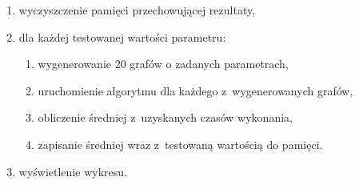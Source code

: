 \documentclass[11pt,a4paper]{article}
\begin{document}
\begin{enumerate}
  \item wyczyszczenie pamięci przechowującej rezultaty,
  \item dla każdej testowanej wartości parametru:
  \begin{enumerate}
    \item wygenerowanie 20 grafów o zadanych parametrach,
    \item uruchomienie algorytmu dla każdego z~wygenerowanych grafów,
    \item obliczenie średniej z~uzyskanych czasów wykonania,
    \item zapisanie średniej wraz z~testowaną wartością do pamięci.
  \end{enumerate}
  \item wyświetlenie wykresu.
\end{enumerate}

\newpage
\end{document}
